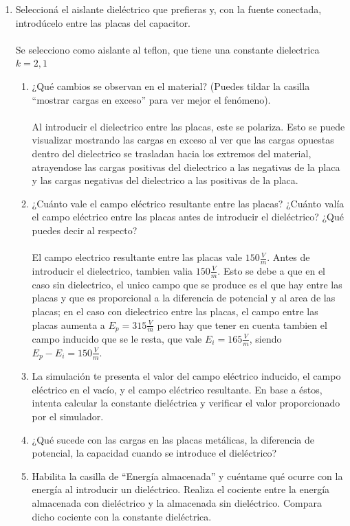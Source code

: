 \documentclass[12pt]{report}
\begin{document}
\begin{enumerate}
    \item Seleccioná el aislante dieléctrico que prefieras y, con la fuente conectada, introdúcelo entre las placas del capacitor.
        \\\\Se selecciono como aislante al teflon, que tiene una constante dielectrica $k = 2,1$
    \begin{enumerate}
        \item ¿Qué cambios se observan en el material? (Puedes tildar la casilla “mostrar cargas en exceso” para ver mejor el fenómeno).
        \\\\Al introducir el dielectrico entre las placas, este se polariza. Esto se puede visualizar mostrando las cargas en exceso al ver que las cargas opuestas dentro del dielectrico se trasladan hacia los extremos del material, atrayendose las cargas positivas del dielectrico a las negativas de la placa y las cargas negativas del dielectrico a las positivas de la placa.
        \item ¿Cuánto vale el campo eléctrico resultante entre las placas? ¿Cuánto valía el campo eléctrico entre las placas antes de introducir el dieléctrico? ¿Qué puedes decir al respecto?
        \\\\El campo electrico resultante entre las placas vale $150\frac{V}{m}$. Antes de introducir el dielectrico, tambien valia $150\frac{V}{m}$. Esto se debe a que en el caso sin dielectrico, el unico campo que se produce es el que hay entre las placas y que es proporcional a la diferencia de potencial y al area de las placas; en el caso con dielectrico entre las placas, el campo entre las placas aumenta a $E_p = 315\frac{V}{m}$ pero hay que tener en cuenta tambien el campo inducido que se le resta, que vale $E_i = 165\frac{V}{m}$, siendo $E_p - E_i = 150\frac{V}{m}$.
        \item La simulación te presenta el valor del campo eléctrico inducido, el campo eléctrico en el vacío, y el campo eléctrico resultante. En base a éstos, intenta calcular la constante dieléctrica y verificar el valor proporcionado por el simulador.
        \item ¿Qué sucede con las cargas en las placas metálicas, la diferencia de potencial, la capacidad cuando se introduce el dieléctrico?
        \item Habilita la casilla de “Energía almacenada” y cuéntame qué ocurre con la energía al introducir un dieléctrico. Realiza el cociente entre la energía almacenada con dieléctrico y la almacenada sin dieléctrico. Compara dicho cociente con la constante dieléctrica.

\end{enumerate}
\end{enumerate}
\end{document}
